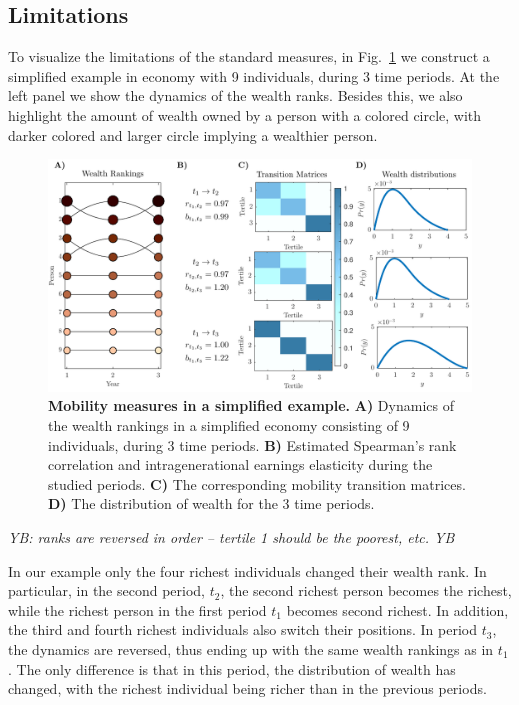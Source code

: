 \documentclass[11pt]{article}
\newcommand{\blue}[1]{{\color{blue} #1}}
\newcommand{\YB}[1]{\blue{{\it YB: #1 YB}}}
\newcommand{\fref}[1]{Fig.~\ref{fig:#1}}
\numberwithin{equation}{section}
\begin{document}
\subsection{Limitations}

To visualize the limitations of the standard measures, in \fref{standard-mobility-measures} we construct a simplified example in economy with 9 individuals, during 3 time periods. At the left panel we show the dynamics of the wealth ranks. Besides this, we also highlight the amount of wealth owned by a person with a colored circle, with darker colored and larger circle implying a wealthier person.
%
\begin{figure}[!htb]
\centering
\includegraphics[width=1.0\textwidth]{figs/fig_mobility_measures.pdf}
\caption{\textbf{Mobility measures in a simplified example.} \textbf{A)} Dynamics of the wealth rankings in a simplified economy consisting of 9 individuals, during 3 time periods. \textbf{B)} Estimated Spearman's rank correlation and intragenerational earnings elasticity during the studied periods. \textbf{C)} The corresponding mobility transition matrices. \textbf{D)} The distribution of wealth for the 3 time periods.
\label{fig:standard-mobility-measures}}
\end{figure}

\YB{ranks are reversed in order -- tertile 1 should be the poorest, etc.}

In our example only the four richest individuals changed their wealth rank. In particular, in the second period, $t_2$, the second richest person becomes the richest, while the richest person in the first period $t_1$ becomes second richest. In addition, the third and fourth richest individuals also switch their positions. In period $t_3$, the dynamics are reversed, thus ending up with the same wealth rankings as in $t_1$. The only difference is that in this period, the distribution of wealth has changed, with the richest individual being richer than in the previous periods.
\end{document}
